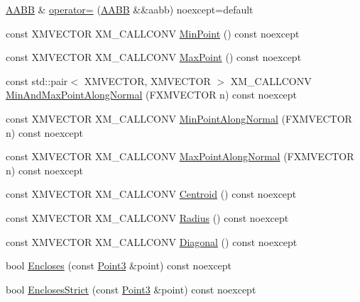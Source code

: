 \begin{DoxyCompactItemize}
\item 
\mbox{\hyperlink{classmage_1_1_a_a_b_b}{A\+A\+BB}} \& \mbox{\hyperlink{classmage_1_1_a_a_b_b_acc54304ce3bde3ea3aa2b487f2d975b7}{operator=}} (\mbox{\hyperlink{classmage_1_1_a_a_b_b}{A\+A\+BB}} \&\&aabb) noexcept=default
\item 
const X\+M\+V\+E\+C\+T\+OR X\+M\+\_\+\+C\+A\+L\+L\+C\+O\+NV \mbox{\hyperlink{classmage_1_1_a_a_b_b_ad351ed7fe9d7031e4d6eb68f4b4d69eb}{Min\+Point}} () const noexcept
\item 
const X\+M\+V\+E\+C\+T\+OR X\+M\+\_\+\+C\+A\+L\+L\+C\+O\+NV \mbox{\hyperlink{classmage_1_1_a_a_b_b_a98ec13950f8374c0bf6c4958f2203396}{Max\+Point}} () const noexcept
\item 
const std\+::pair$<$ X\+M\+V\+E\+C\+T\+OR, X\+M\+V\+E\+C\+T\+OR $>$ X\+M\+\_\+\+C\+A\+L\+L\+C\+O\+NV \mbox{\hyperlink{classmage_1_1_a_a_b_b_a34b2948ec856a284dcedceaf54ec4569}{Min\+And\+Max\+Point\+Along\+Normal}} (F\+X\+M\+V\+E\+C\+T\+OR n) const noexcept
\item 
const X\+M\+V\+E\+C\+T\+OR X\+M\+\_\+\+C\+A\+L\+L\+C\+O\+NV \mbox{\hyperlink{classmage_1_1_a_a_b_b_a57e7a66ec6e418b2a5367e55b98ef547}{Min\+Point\+Along\+Normal}} (F\+X\+M\+V\+E\+C\+T\+OR n) const noexcept
\item 
const X\+M\+V\+E\+C\+T\+OR X\+M\+\_\+\+C\+A\+L\+L\+C\+O\+NV \mbox{\hyperlink{classmage_1_1_a_a_b_b_a91e0d95d5deaba8c96a36d490ed99a39}{Max\+Point\+Along\+Normal}} (F\+X\+M\+V\+E\+C\+T\+OR n) const noexcept
\item 
const X\+M\+V\+E\+C\+T\+OR X\+M\+\_\+\+C\+A\+L\+L\+C\+O\+NV \mbox{\hyperlink{classmage_1_1_a_a_b_b_a7555db5bea72d1e7ba04931fcbb88aa0}{Centroid}} () const noexcept
\item 
const X\+M\+V\+E\+C\+T\+OR X\+M\+\_\+\+C\+A\+L\+L\+C\+O\+NV \mbox{\hyperlink{classmage_1_1_a_a_b_b_a02d21281c08926f793804fb9f66869b3}{Radius}} () const noexcept
\item 
const X\+M\+V\+E\+C\+T\+OR X\+M\+\_\+\+C\+A\+L\+L\+C\+O\+NV \mbox{\hyperlink{classmage_1_1_a_a_b_b_ad3e011e47a16a9ecb84811296bbbcb1c}{Diagonal}} () const noexcept
\item 
bool \mbox{\hyperlink{classmage_1_1_a_a_b_b_a308fce591178a9aeaed3838dfa32972f}{Encloses}} (const \mbox{\hyperlink{structmage_1_1_point3}{Point3}} \&point) const noexcept
\item 
bool \mbox{\hyperlink{classmage_1_1_a_a_b_b_a0399860c66da2dfc593b6ad5702c7525}{Encloses\+Strict}} (const \mbox{\hyperlink{structmage_1_1_point3}{Point3}} \&point) const noexcept
\item 

\end{DoxyCompactItemize}

